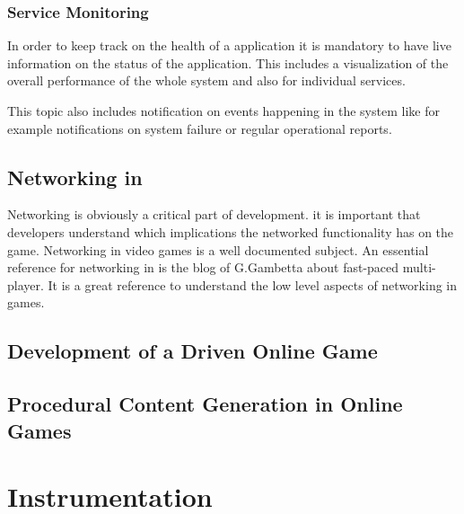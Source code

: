 \subsubsection{Service Monitoring}

In order to keep track on the health of a \ms{} application it is mandatory to
have live information on the status of the application. This includes a
visualization of the overall performance of the whole system and also for
individual services.

This topic also includes notification on events happening in the system like for
example notifications on system failure or regular operational reports. 

\subsection{Networking in \ogs{}}

Networking is obviously a critical part of \og{} development. it is important
that developers understand which implications the networked functionality has
on the game. Networking in video games is a well documented subject. An
essential reference for networking in \ogs{} is the blog of G.Gambetta\cite{}
about fast-paced multi-player. It is a great reference to understand the low
level aspects of networking in games.


\subsection{Development of a \ms{} Driven Online Game}

\subsection{Procedural Content Generation in Online Games}
























\section{Instrumentation}

